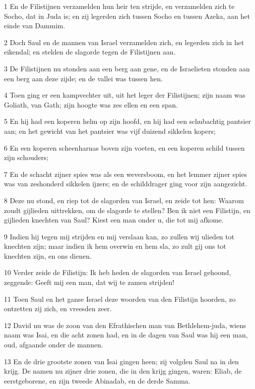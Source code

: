 \par 1 En de Filistijnen verzamelden hun heir ten strijde, en verzamelden zich te Socho, dat in Juda is; en zij legerden zich tussen Socho en tussen Azeka, aan het einde van Dammim.
\par 2 Doch Saul en de mannen van Israel verzamelden zich, en legerden zich in het eikendal; en stelden de slagorde tegen de Filistijnen aan.
\par 3 De Filistijnen nu stonden aan een berg aan gene, en de Israelieten stonden aan een berg aan deze zijde; en de vallei was tussen hen.
\par 4 Toen ging er een kampvechter uit, uit het leger der Filistijnen; zijn naam was Goliath, van Gath; zijn hoogte was zes ellen en een span.
\par 5 En hij had een koperen helm op zijn hoofd, en hij had een schubachtig pantsier aan; en het gewicht van het pantsier was vijf duizend sikkelen kopers;
\par 6 En een koperen scheenharnas boven zijn voeten, en een koperen schild tussen zijn schouders;
\par 7 En de schacht zijner spies was als een weversboom, en het lemmer zijner spies was van zeshonderd sikkelen ijzers; en de schilddrager ging voor zijn aangezicht.
\par 8 Deze nu stond, en riep tot de slagorden van Israel, en zeide tot hen: Waarom zoudt gijlieden uittrekken, om de slagorde te stellen? Ben ik niet een Filistijn, en gijlieden knechten van Saul? Kiest een man onder u, die tot mij afkome.
\par 9 Indien hij tegen mij strijden en mij verslaan kan, zo zullen wij ulieden tot knechten zijn; maar indien ik hem overwin en hem sla, zo zult gij ons tot knechten zijn, en ons dienen.
\par 10 Verder zeide de Filistijn: Ik heb heden de slagorden van Israel gehoond, zeggende: Geeft mij een man, dat wij te zamen strijden!
\par 11 Toen Saul en het ganse Israel deze woorden van den Filistijn hoorden, zo ontzetten zij zich, en vreesden zeer.
\par 12 David nu was de zoon van den Efrathischen man van Bethlehem-juda, wiens naam was Isai, en die acht zonen had, en in de dagen van Saul was hij een man, oud, afgaande onder de mannen.
\par 13 En de drie grootste zonen van Isai gingen heen; zij volgden Saul na in den krijg. De namen nu zijner drie zonen, die in den krijg gingen, waren: Eliab, de eerstgeborene, en zijn tweede Abinadab, en de derde Samma.
